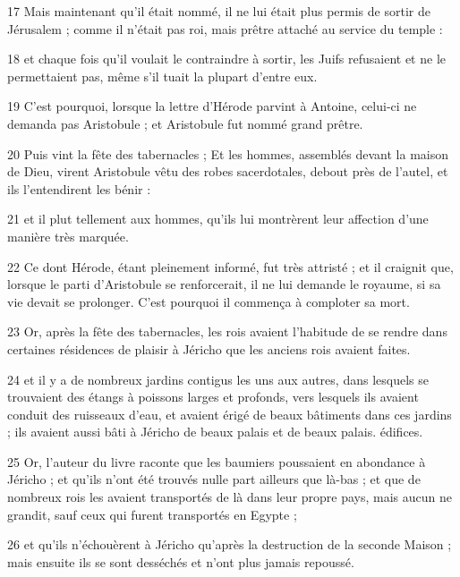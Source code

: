 \par 17 Mais maintenant qu'il était nommé, il ne lui était plus permis de sortir de Jérusalem ; comme il n'était pas roi, mais prêtre attaché au service du temple :

\par 18 et chaque fois qu'il voulait le contraindre à sortir, les Juifs refusaient et ne le permettaient pas, même s'il tuait la plupart d'entre eux.

\par 19 C'est pourquoi, lorsque la lettre d'Hérode parvint à Antoine, celui-ci ne demanda pas Aristobule ; et Aristobule fut nommé grand prêtre.

\par 20 Puis vint la fête des tabernacles ; Et les hommes, assemblés devant la maison de Dieu, virent Aristobule vêtu des robes sacerdotales, debout près de l'autel, et ils l'entendirent les bénir :

\par 21 et il plut tellement aux hommes, qu'ils lui montrèrent leur affection d'une manière très marquée.

\par 22 Ce dont Hérode, étant pleinement informé, fut très attristé ; et il craignit que, lorsque le parti d'Aristobule se renforcerait, il ne lui demande le royaume, si sa vie devait se prolonger. C'est pourquoi il commença à comploter sa mort.

\par 23 Or, après la fête des tabernacles, les rois avaient l'habitude de se rendre dans certaines résidences de plaisir à Jéricho que les anciens rois avaient faites.

\par 24 et il y a de nombreux jardins contigus les uns aux autres, dans lesquels se trouvaient des étangs à poissons larges et profonds, vers lesquels ils avaient conduit des ruisseaux d'eau, et avaient érigé de beaux bâtiments dans ces jardins ; ils avaient aussi bâti à Jéricho de beaux palais et de beaux palais. édifices.

\par 25 Or, l'auteur du livre raconte que les baumiers poussaient en abondance à Jéricho ; et qu'ils n'ont été trouvés nulle part ailleurs que là-bas ; et que de nombreux rois les avaient transportés de là dans leur propre pays, mais aucun ne grandit, sauf ceux qui furent transportés en Egypte ;

\par 26 et qu'ils n'échouèrent à Jéricho qu'après la destruction de la seconde Maison ; mais ensuite ils se sont desséchés et n'ont plus jamais repoussé.

